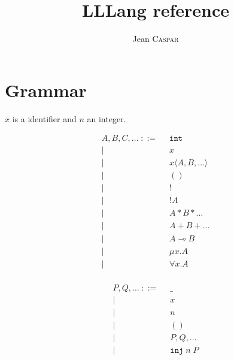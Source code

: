 \documentclass{scrartcl}
\title{LLLang reference}
\author{Jean \textsc{Caspar}}
\begin{document}
\maketitle

\tableofcontents

\newpage

\section{Grammar}

$x$ is a identifier and $n$ an integer.

\hspace{-2cm}
\begin{minipage}[t]{10cm}
  \begin{align*}
    A, B, C, \dots \; ::= \;\;
      & \mathtt{int}                  \\
    | & x                             \\
    | & x \langle A, B, \dots \rangle \\
    | & ()                            \\
    | & !                             \\
    | & !A                            \\
    | & A * B * \dots                 \\
    | & A + B + \dots                 \\
    | & A \multimap B                 \\
    | & \mu x. A                      \\
    | & \forall x. A                  \\
  \end{align*}
\end{minipage}
\begin{minipage}[t]{10cm}
  \begin{align*}
    P, Q, \dots \; ::= \;\;
      & \_                 \\
    | & x                  \\
    | & n                  \\
    | & ()                 \\
    | & P, Q, \dots        \\
    | & \mathtt{inj}\;n\;P \\
  \end{align*}
\end{minipage}
\end{document}
